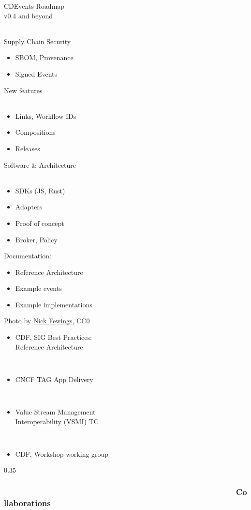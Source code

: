 \documentclass[aspectratio=169,11pt,hyperref={colorlinks=true}]{beamer}
\begin{document}
\begin{stripedframe}%
  {%
  CDEvents Roadmap \\
  v0.4 and beyond \\
  ~
  }%
  {%
  Supply Chain Security
  \begin{itemize}
    \item SBOM, Provenance
  \end{itemize}
  \begin{itemize}
    \item Signed Events
  \end{itemize}
  }%
  {%
  New features \\
  ~
  \begin{itemize}
    \item Links, Workflow IDs
    \item Compositions
    \item Releases
  \end{itemize}
  }%
  {%
  Software \& Architecture\\
  ~
  \begin{itemize}
    \item SDKs (JS, Rust)
    \item Adapters
    \item Proof of concept
    \item Broker, Policy
  \end{itemize}
  }%
  {%
  Documentation:
  \begin{itemize}
    \item Reference Architecture
    \item Example events
    \item Example implementations
  \end{itemize}
  }%
\end{stripedframe}

\begin{lpicrblack}{%
  Photo by \href{https://unsplash.com/@jannerboy62}{\underline{Nick Fewings}}, CC0
  }%
  {%
  \begin{itemize}
    \item CDF, SIG Best Practices:\\
    Reference Architecture
  \end{itemize}
  ~ \\
  \begin{itemize}
    \item CNCF TAG App Delivery
  \end{itemize}
  ~ \\
  \begin{itemize}
    \item Value Stream Management\\
          Interoperability (VSMI) TC
  \end{itemize}
  ~ \\
  \begin{itemize}
    \item CDF, Workshop working group
  \end{itemize}
  }%
  {0.35}
  \frametitle{~~~~~~~~~~~~~~~~~~~~~~~~~~~~~~~~~~~~~~~~~~~~~~~~~~~Collaborations}
\end{lpicrblack}
\end{document}
